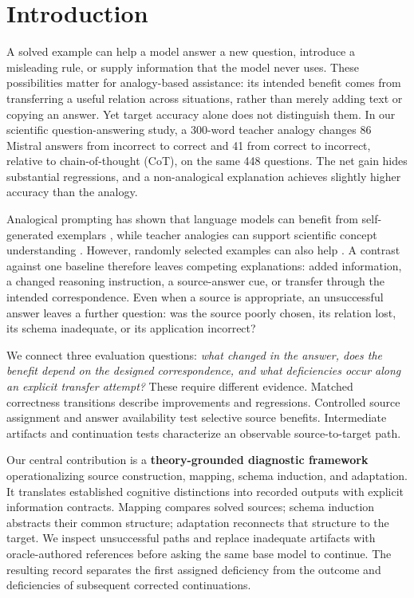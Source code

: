 \section{Introduction}
\label{sec:introduction}
A solved example can help a model answer a new question, introduce a misleading rule, or supply information that the model never uses. These possibilities matter for analogy-based assistance: its intended benefit comes from transferring a useful relation across situations, rather than merely adding text or copying an answer. Yet target accuracy alone does not distinguish them. In our scientific question-answering study, a 300-word teacher analogy changes 86 Mistral answers from incorrect to correct and 41 from correct to incorrect, relative to chain-of-thought (CoT), on the same 448 questions. The net gain hides substantial regressions, and a non-analogical explanation achieves slightly higher accuracy than the analogy.

Analogical prompting has shown that language models can benefit from self-generated exemplars \citep{yasunaga2024analogical}, while teacher analogies can support scientific concept understanding \citep{yuan2024boosting}. However, randomly selected examples can also help \citep{qin2025relevant}. A contrast against one baseline therefore leaves competing explanations: added information, a changed reasoning instruction, a source-answer cue, or transfer through the intended correspondence. Even when a source is appropriate, an unsuccessful answer leaves a further question: was the source poorly chosen, its relation lost, its schema inadequate, or its application incorrect?

We connect three evaluation questions: \emph{what changed in the answer, does the benefit depend on the designed correspondence, and what deficiencies occur along an explicit transfer attempt?} These require different evidence. Matched correctness transitions describe improvements and regressions. Controlled source assignment and answer availability test selective source benefits. Intermediate artifacts and continuation tests characterize an observable source-to-target path.

Our central contribution is a \textbf{theory-grounded diagnostic framework} operationalizing source construction, mapping, schema induction, and adaptation. It translates established cognitive distinctions into recorded outputs with explicit information contracts. Mapping compares solved sources; schema induction abstracts their common structure; adaptation reconnects that structure to the target. We inspect unsuccessful paths and replace inadequate artifacts with oracle-authored references before asking the same base model to continue. The resulting record separates the first assigned deficiency from the outcome and deficiencies of subsequent corrected continuations.

